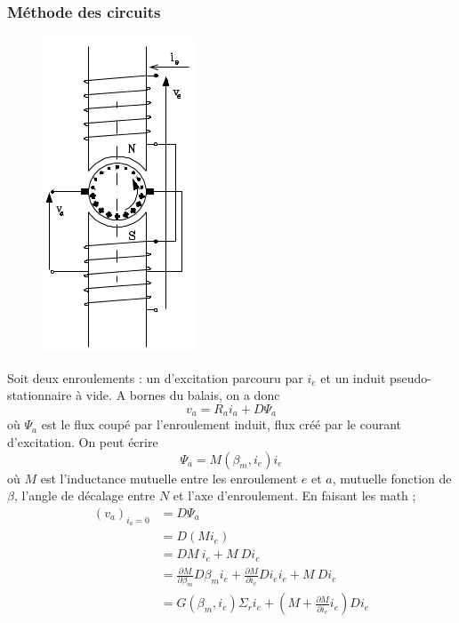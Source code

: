 		\subsubsection{Méthode des circuits}
		\begin{figure}
		\vspace{-5mm}
		\includegraphics[scale=0.5]{ch4/image7.png}
		\end{figure}
		Soit deux enroulements : un d'excitation parcouru par $i_e$ 
		et un induit pseudo-stationnaire à vide. A bornes du balais, 
		on a donc
		\begin{equation}
		v_a = R_ai_a+D\Psi_a
		\end{equation}
		où $\Psi_a$ est le flux coupé par l'enroulement induit, flux 
		créé par le courant d'excitation. On peut écrire
		\begin{equation}
		\Psi_a = M(\beta_m,i_e)i_e
		\end{equation}
		où $M$ est l'inductance mutuelle entre les enroulement $e$ 
		et $a$, mutuelle fonction de $\beta$, l'angle de décalage 
		entre $N$ et l'axe d'enroulement. En faisant les math ;
		\begin{equation}
		\begin{array}{ll}
		(v_a)_{i_a=0} &= \displaystyle D\Psi_a\\
		&= \displaystyle D(Mi_e)\\
		&= \displaystyle  DM\ i_e + M\ Di_e\\
		&= \displaystyle \frac{\partial M}{\partial \beta_m}D\beta_m
		i_e + \frac{\partial M}{\partial i_e}Di_e i_e + M\ Di_e\\
		&= \displaystyle G(\beta_m,i_e)\Sigma_r i_e +\left(M+\frac{
		\partial M}{\partial i_e}i_e\right)Di_e
		\end{array}
		\end{equation}
